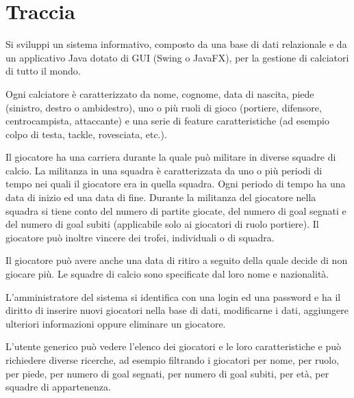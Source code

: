 \section{Traccia}

Si sviluppi un sistema informativo, composto da una base
di dati relazionale e da un applicativo Java dotato
di GUI (Swing o JavaFX), per la gestione
di calciatori di tutto il mondo.

Ogni calciatore è caratterizzato da nome, cognome,
data di nascita, piede (sinistro, destro o ambidestro),
uno o più ruoli di gioco (portiere, difensore,
centrocampista, attaccante) e una serie
di feature caratteristiche (ad esempio colpo di testa,
tackle, rovesciata, etc.).

Il giocatore ha una carriera durante
la quale può militare in diverse squadre di calcio.
La militanza in una squadra è caratterizzata
da uno o più periodi di tempo nei quali
il giocatore era in quella squadra.
Ogni periodo di tempo ha una data di inizio
ed una data di fine.
Durante la militanza del giocatore nella squadra
si tiene conto del numero di partite giocate,
del numero di goal segnati e del numero
di goal subiti (applicabile solo ai giocatori
di ruolo portiere). Il giocatore può inoltre vincere
dei trofei, individuali o di squadra.

Il giocatore può avere anche una data di ritiro
a seguito della quale decide di non giocare più.
Le squadre di calcio sono specificate
dal loro nome e nazionalità.

L’amministratore del sistema si identifica con una login
ed una password e ha il diritto di inserire
nuovi giocatori nella base di dati, modificarne i dati,
aggiungere ulteriori informazioni
oppure eliminare un giocatore.

L’utente generico può vedere l’elenco dei giocatori e
le loro caratteristiche e può richiedere diverse ricerche,
ad esempio filtrando i giocatori per nome, per ruolo,
per piede, per numero di goal segnati,
per numero di goal subiti, per età,
per squadre di appartenenza.
